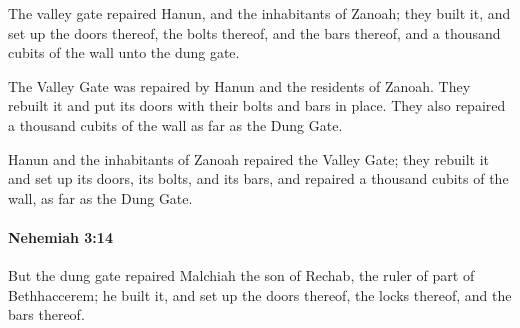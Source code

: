 			\begin{versebox}
					\item[BHS] 
					\item[LXX] 
					\item[ASV] The valley gate repaired Hanun, and the inhabitants of Zanoah; they built it, and set up the doors thereof, the bolts thereof, and the bars thereof, and a thousand cubits of the wall unto the dung gate.
					\item[NIV] The Valley Gate was repaired by Hanun and the residents of Zanoah. They rebuilt it and put its doors with their bolts and bars in place. They also repaired a thousand cubits of the wall as far as the Dung Gate.
					\item[NRSV] Hanun and the inhabitants of Zanoah repaired the Valley Gate; they rebuilt it and set up its doors, its bolts, and its bars, and repaired a thousand cubits of the wall, as far as the Dung Gate.
			\end{versebox}

		\paragraph{Nehemiah 3:14} %
			\label{NEHEMIAH-3-14}

			But the dung gate repaired Malchiah the son of Rechab, the ruler of part of Bethhaccerem; he built it, and set up the doors thereof, the locks thereof, and the bars thereof.

